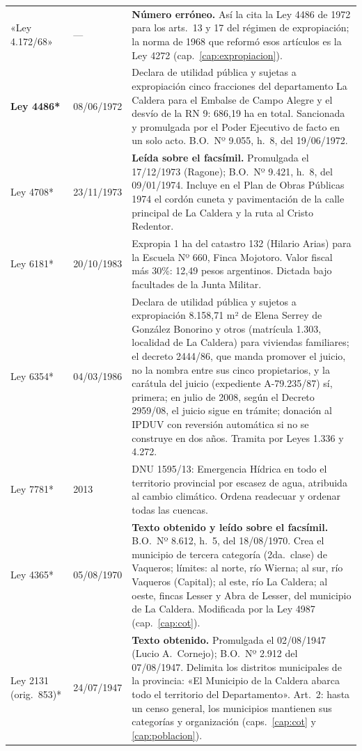 \begin{longtable}{@{}p{3.2cm}p{1.9cm}p{7.9cm}@{}}
«Ley 4.172/68» & --- & \textbf{Número erróneo.} Así la cita la Ley 4486 de 1972 para los arts.\ 13 y 17 del régimen de expropiación; la norma de 1968 que reformó esos artículos es la Ley 4272 (cap.\ \ref{cap:expropiacion}). \\
\textbf{Ley 4486*} & 08/06/1972 & Declara de utilidad pública y sujetas a expropiación cinco fracciones del departamento La Caldera para el Embalse de Campo Alegre y el desvío de la RN 9: 686,19 ha en total. Sancionada y promulgada por el Poder Ejecutivo de facto en un solo acto. B.O.\ Nº 9.055, h.\ 8, del 19/06/1972. \\
Ley 4708* & 23/11/1973 & \textbf{Leída sobre el facsímil.} Promulgada el 17/12/1973 (Ragone); B.O.\ Nº 9.421, h.\ 8, del 09/01/1974. Incluye en el Plan de Obras Públicas 1974 el cordón cuneta y pavimentación de la calle principal de La Caldera y la ruta al Cristo Redentor. \\
Ley 6181* & 20/10/1983 & Expropia 1 ha del catastro 132 (Hilario Arias) para la Escuela Nº 660, Finca Mojotoro. Valor fiscal más 30\%: 12,49 pesos argentinos. Dictada bajo facultades de la Junta Militar. \\
Ley 6354* & 04/03/1986 & Declara de utilidad pública y sujetos a expropiación 8.158,71 m² de Elena Serrey\index{Serrey, Elena} de González Bonorino y otros (matrícula 1.303, localidad de La Caldera) para viviendas familiares; el decreto 2444/86, que manda promover el juicio, no la nombra entre sus cinco propietarios, y la carátula del juicio (expediente A-79.235/87) sí, primera; en julio de 2008, según el Decreto 2959/08, el juicio sigue en trámite; donación al IPDUV con reversión automática si no se construye en dos años. Tramita por Leyes 1.336 y 4.272. \\
Ley 7781* & 2013 & DNU 1595/13: Emergencia Hídrica en todo el territorio provincial por escasez de agua, atribuida al cambio climático. Ordena readecuar y ordenar todas las cuencas. \\
Ley 4365* & 05/08/1970 & \textbf{Texto obtenido y leído sobre el facsímil.} B.O.\ Nº 8.612, h.\ 5, del 18/08/1970. Crea el municipio de tercera categoría (2da.\ clase) de Vaqueros; límites: al norte, río Wierna; al sur, río Vaqueros (Capital); al este, río La Caldera; al oeste, fincas Lesser y Abra de Lesser, del municipio de La Caldera. Modificada por la Ley 4987 (cap.\ \ref{cap:cot}). \\
Ley 2131 (orig.\ 853)* & 24/07/1947 & \textbf{Texto obtenido.} Promulgada el 02/08/1947 (Lucio A.\ Cornejo); B.O.\ Nº 2.912 del 07/08/1947. Delimita los distritos municipales de la provincia: «El Municipio de la Caldera abarca todo el territorio del Departamento». Art.\ 2: hasta un censo general, los municipios mantienen sus categorías y organización (caps.\ \ref{cap:cot} y \ref{cap:poblacion}). \\

\end{longtable}
